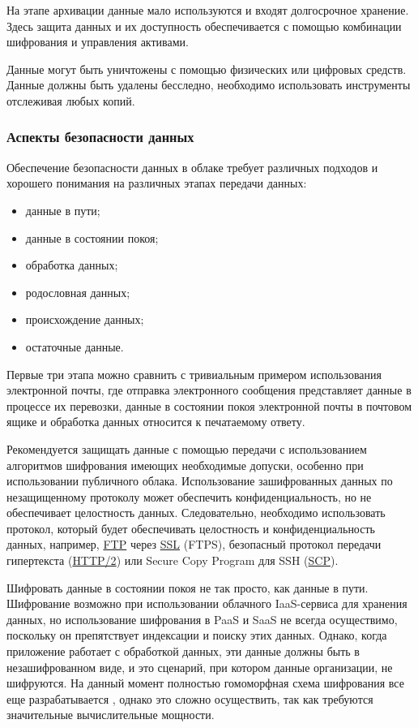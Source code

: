 На этапе архивации данные мало используются и входят долгосрочное хранение.
Здесь защита данных и их доступность обеспечивается с помощью комбинации шифрования и управления активами.

Данные могут быть уничтожены с помощью физических или цифровых средств.
Данные должны быть удалены бесследно, необходимо использовать инструменты отслеживая любых копий.

\subsubsection{Аспекты безопасности данных}

Обеспечение безопасности данных в облаке требует различных подходов и хорошего понимания на различных этапах передачи данных:
\begin{itemize}
  \item данные в пути;
  \item данные в состоянии покоя;
  \item обработка данных;
  \item родословная данных;
  \item происхождение данных;
  \item остаточные данные.
\end{itemize}

Первые три этапа можно сравнить с тривиальным примером использования электронной почты, где отправка электронного сообщения представляет данные в процессе их перевозки, данные в состоянии покоя электронной почты в почтовом ящике и обработка данных относится к печатаемому ответу.

Рекомендуется защищать данные с помощью передачи с использованием алгоритмов шифрования имеющих необходимые допуски, особенно при использовании публичного облака.
Использование зашифрованных данных по незащищенному протоколу может обеспечить конфиденциальность, но не обеспечивает целостность данных.
Следовательно, необходимо использовать протокол, который будет обеспечивать целостность и конфиденциальность данных, например, \hyperlink{ftp}{FTP} через \hyperlink{ssl}{SSL} (FTPS), безопасный протокол передачи гипертекста (\hyperlink{http}{HTTP/2}) или Secure Copy Program для SSH (\hyperlink{scp}{SCP}).

Шифровать данные в состоянии покоя не так просто, как данные в пути.
Шифрование возможно при использовании облачного IaaS-сервиса для хранения данных, но использование шифрования в PaaS и SaaS не всегда осуществимо, поскольку он препятствует индексации и поиску этих данных.
Однако, когда приложение работает с обработкой данных, эти данные должны быть в незашифрованном виде, и это сценарий, при котором данные организации, не шифруются.
На данный момент полностью гомоморфная схема шифрования все еще разрабатывается \cite{ibm}, однако это сложно осуществить, так как требуются значительные вычислительные мощности.

